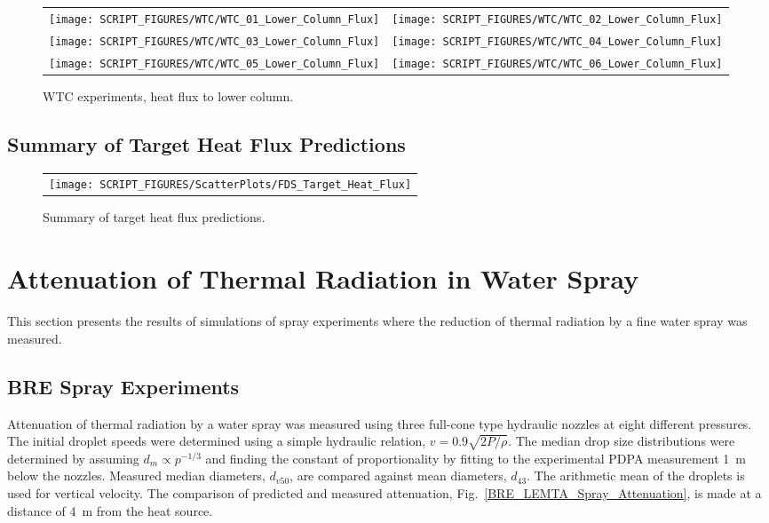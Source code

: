 \begin{figure}[p]
\begin{tabular*}{\textwidth}{l@{\extracolsep{\fill}}r}
\texttt{[image: SCRIPT\_FIGURES/WTC/WTC\_01\_Lower\_Column\_Flux]} &
\texttt{[image: SCRIPT\_FIGURES/WTC/WTC\_02\_Lower\_Column\_Flux]} \\
\texttt{[image: SCRIPT\_FIGURES/WTC/WTC\_03\_Lower\_Column\_Flux]} &
\texttt{[image: SCRIPT\_FIGURES/WTC/WTC\_04\_Lower\_Column\_Flux]} \\
\texttt{[image: SCRIPT\_FIGURES/WTC/WTC\_05\_Lower\_Column\_Flux]} &
\texttt{[image: SCRIPT\_FIGURES/WTC/WTC\_06\_Lower\_Column\_Flux]}
\end{tabular*}
\caption{WTC experiments, heat flux to lower column.}
\label{NIST_WTC_Lower_Column_Flux}
\end{figure}


\clearpage

\subsection{Summary of Target Heat Flux Predictions}
\label{Target Heat Flux}

\begin{figure}[h!]
\begin{center}
\begin{tabular}{c}
\texttt{[image: SCRIPT\_FIGURES/ScatterPlots/FDS\_Target\_Heat\_Flux]}
\end{tabular}
\end{center}
\caption[Summary of target heat flux predictions]
{Summary of target heat flux predictions.}
\end{figure}



\clearpage

\section{Attenuation of Thermal Radiation in Water Spray}

This section presents the results of simulations of spray experiments where the reduction of thermal radiation by a fine water spray was measured.

\subsection{BRE Spray Experiments}

Attenuation of thermal radiation by a water spray was measured using three full-cone type hydraulic nozzles at eight different pressures. The initial droplet speeds were determined using a simple hydraulic relation, $v = 0.9 \sqrt{2P/\rho}$. The median drop size distributions were determined by assuming $d_m \propto p^{-1/3}$ and finding the constant of proportionality by fitting to the experimental PDPA measurement 1~m below the nozzles.  Measured median diameters, $d_{v50}$, are compared against mean diameters, $d_{43}$. The arithmetic mean of the droplets is used for vertical velocity. The comparison of predicted and measured attenuation, Fig.~\ref{BRE_LEMTA_Spray_Attenuation}, is made at a distance of 4~m from the heat source.

